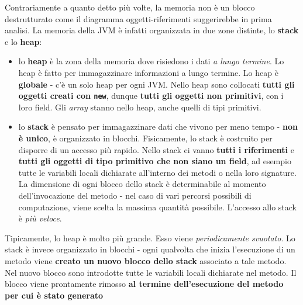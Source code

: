 \documentclass[\fontsizeclass,twocolumn]{\classname}
\theoremstyle{definition}
\theoremstyle{definition}
\begin{document}
Contrariamente a quanto detto più volte, la memoria non è un blocco
destrutturato come il diagramma oggetti-riferimenti suggerirebbe in prima
analisi. La memoria della JVM è infatti organizzata in due zone distinte, lo
\textbf{stack} e lo \textbf{heap}:
\begin{itemize}
    \item lo \textbf{heap} è la zona della memoria dove risiedono i dati
        \emph{a lungo termine}. Lo heap è fatto per immagazzinare informazioni
        a lungo termine. Lo heap è \textbf{globale} \-- c'è un solo heap per
        ogni JVM. Nello heap sono collocati \textbf{tutti gli oggetti creati
        con \texttt{new}}, dunque \textbf{tutti gli oggetti non primitivi}, con i loro
        field. Gli \emph{array} stanno nello heap, anche quelli di tipi
        primitivi.
    \item lo \textbf{stack} è pensato per immagazzinare dati che vivono per
        meno tempo \-- \textbf{non è unico}, è organizzato in blocchi.
        Fisicamente, lo stack è costruito per disporre di un accesso più
        rapido. Nello stack ci vanno \textbf{tutti i riferimenti} e
        \textbf{tutti gli oggetti di tipo primitivo che non siano un field}, ad
        esempio tutte le variabili locali dichiarate all'interno dei metodi o
        nella loro signature. La dimensione di ogni blocco dello stack è
        determinabile al momento dell'invocazione del metodo \-- nel caso di
        vari percorsi possibili di computazione, viene scelta la massima
        quantità possibile. L'accesso allo stack è \emph{più veloce}.
\end{itemize}

Tipicamente, lo heap è molto più grande. Esso viene \emph{periodicamente
svuotato}. Lo stack è invece organizzato in blocchi \-- ogni qualvolta che
inizia l'esecuzione di un metodo viene \textbf{creato un nuovo blocco dello
stack} associato a tale metodo. Nel nuovo blocco sono introdotte tutte le
variabili locali dichiarate nel metodo. Il blocco viene prontamente rimosso
\textbf{al termine dell'esecuzione del metodo per cui è stato generato}
\end{document}
